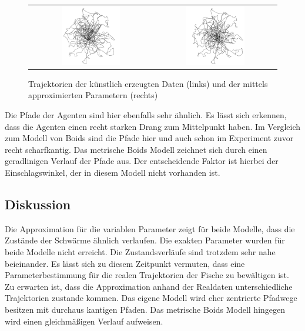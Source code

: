 \begin{figure}[H]
\centering
\begin{tabular}{cc}
\includegraphics[width=0.5\textwidth]{figures/Experimente/Parameter_variabel/pwd_true.png}&
\includegraphics[width=0.5\textwidth]{figures/Experimente/Parameter_variabel/pwd_pred.png}
\end{tabular}
\caption{Trajektorien der künstlich erzeugten Daten (links) und der mittels approximierten Parametern (rechts) \label{fig:APWD}}
\end{figure}

Die Pfade der Agenten sind hier ebenfalls sehr ähnlich. Es lässt sich erkennen, dass die Agenten einen recht starken Drang zum Mittelpunkt haben. Im Vergleich zum Modell von Boids sind die Pfade hier und auch schon im Experiment zuvor recht scharfkantig.
Das metrische Boids Modell zeichnet sich durch einen geradlinigen Verlauf der Pfade aus. Der entscheidende Faktor ist hierbei der Einschlagswinkel, der in diesem Modell nicht vorhanden ist.

\subsection{Diskussion}

Die Approximation für die variablen Parameter zeigt für beide Modelle, dass die Zustände der Schwärme ähnlich verlaufen.
Die exakten Parameter wurden für beide Modelle nicht erreicht. Die Zustandsverläufe sind trotzdem sehr nahe beieinander.
Es lässt sich zu diesem Zeitpunkt vermuten, dass eine Parameterbestimmung für die realen Trajektorien der Fische zu bewältigen ist.
Zu erwarten ist, dass die Approximation anhand der Realdaten unterschiedliche Trajektorien zustande kommen. Das eigene Modell wird eher zentrierte Pfadwege besitzen mit durchaus kantigen Pfaden. Das metrische Boids Modell hingegen wird einen gleichmäßigen Verlauf aufweisen.


